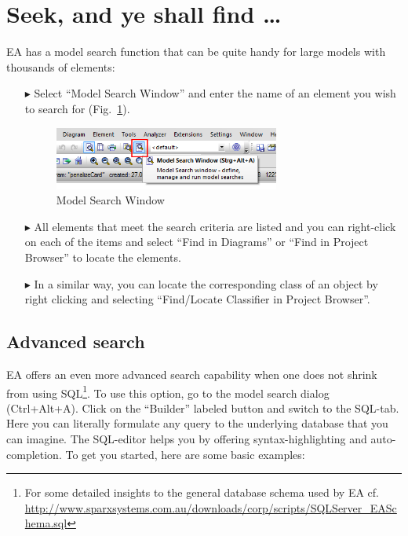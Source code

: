 \section{Seek, and ye shall find \ldots}
EA has a model search function that can be quite handy for large models with thousands of elements:

\begin{enumerate}
\item[$\blacktriangleright$]Select ``Model Search Window'' and enter the name of an element you wish to search for (Fig.~\ref{fig_search01}). 
\begin{figure}[htbp]
\begin{center}
  \includegraphics[width=0.7\textwidth]{pics/tricks/search/search1}
  \caption{Model Search Window}  
  \label{fig_search01}
\end{center}
\end{figure}

\item[$\blacktriangleright$]
All elements that meet the search criteria are listed and you can right-click on each of the items and select ``Find in Diagrams'' or  ``Find in Project Browser'' to locate the elements. 

\item[$\blacktriangleright$]
In a similar way, you can locate the corresponding class of an object by right clicking and selecting ``Find/Locate Classifier in Project Browser''.
\end{enumerate}

\subsection{Advanced search}
EA offers an even more advanced search capability when one does not shrink from
using SQL\footnote{For some detailed insights to the general database schema
used by EA cf. \\
\url{http://www.sparxsystems.com.au/downloads/corp/scripts/SQLServer_EASchema.sql}}.
To use this option, go to the model search dialog (\mbox{Ctrl+Alt+A}). Click on
the ``Builder'' labeled button and switch to the SQL-tab. Here you can
literally formulate any query to the underlying database that you can imagine.
The SQL-editor helps you by offering syntax-highlighting and auto-completion. To
get you started, here are some basic examples: 

